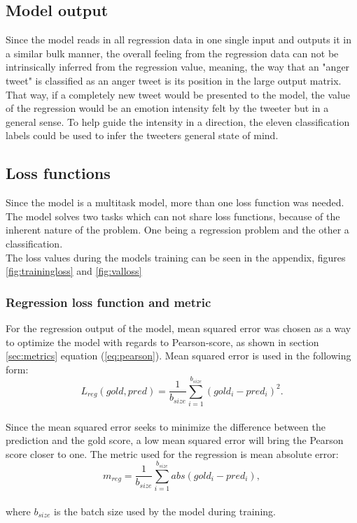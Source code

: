 \subsection{Model output}
Since the model reads in all regression data in one single input and outputs it in a similar bulk manner, the overall feeling from the regression data can not be intrinsically inferred from the regression value, meaning, the way that an "anger tweet" is classified as an anger tweet is its position in the large output matrix. That way, if a completely new tweet would be presented to the model, the value of the regression would be an emotion intensity felt by the tweeter but in a general sense. To help guide the intensity in a direction, the eleven classification labels could be used to infer the tweeters general state of mind. 

\subsection{Loss functions}
Since the model is a multitask model, more than one loss function was needed. The model solves two tasks which can not share loss functions, because of the inherent nature of the problem. One being a regression problem and the other a classification. \\
The loss values during the models training can be seen in the appendix, figures \ref{fig:trainingloss} and \ref{fig:valloss}

\subsubsection{Regression loss function and metric}
For the regression output of the model, mean squared error was chosen as a way to optimize the model with regards to Pearson-score, as shown in section \ref{sec:metrics} equation (\ref{eq:pearson}). Mean squared error is used in the following form:\\
\begin{equation} \label{eq:lreg}
L_{reg}(gold, pred)=\dfrac{1}{b_{size}}\sum^{b_{size}}_{i=1}\left(gold_{i}-pred_{i}\right)^{2}.
\end{equation}\\
Since the mean squared error seeks to minimize the difference between the prediction and the gold score, a low mean squared error will bring the Pearson score closer to one. 
The metric used for the regression is mean absolute error:\\
\begin{equation} \label{eq:meanabs}
m_{reg}=\dfrac{1}{b_{size}}\sum^{b_{size}}_{i=1}abs\left(gold_{i}-pred_{i}\right),
\end{equation}\\
where $b_{size}$ is the batch size used by the model during training. 


